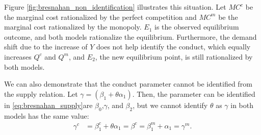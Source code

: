 \documentclass[11pt, a4paper]{article}
\theoremstyle{remark}
\begin{document}
Figure \ref{fig:bresnahan_non_identification} illustrates this situation.
Let $MC^c$ be the marginal cost rationalized by the perfect competition and $MC^m$ be the marginal cost rationalized by the monopoly.
$E_1$ is the observed equilibrium outcome, and both models rationalize the equilibrium.
Furthermore, the demand shift due to the increase of $Y$ does not help identify the conduct, which equally increases $Q^c$ and $Q^m$, and $E_2$, the new equilibrium point, is still rationalized by both models.

We can also demonstrate that the conduct parameter cannot be identified from the supply relation.
Let $\gamma = (\beta_1 + \theta \alpha_1)$.
Then, the parameter can be identified  in \eqref{eq:bresnahan_supply}are $\beta_0$,$\gamma$, and $\beta_2$, but we cannot identify $\theta$ as $\gamma$ in both models has the same value: 
\begin{align}
    \gamma^c &= \beta_1^c + \theta \alpha_1 = \beta^c = \beta_1^m + \alpha_1 = \gamma^m.
\end{align}
\end{document}
